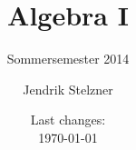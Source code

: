 \documentclass[a4paper,10pt,twoside=semi,openany]{scrbook}
\begin{document}
\subject{Mitschrift zu}
\title{Algebra I}
\subtitle{Sommersemester 2014}
\author{Jendrik Stelzner}
\date{Last changes: \\ \today}

\frontmatter
\maketitle

\tableofcontents


\mainmatter





\addappheadtotoc
\appendix
\appendixpage

\end{document}
